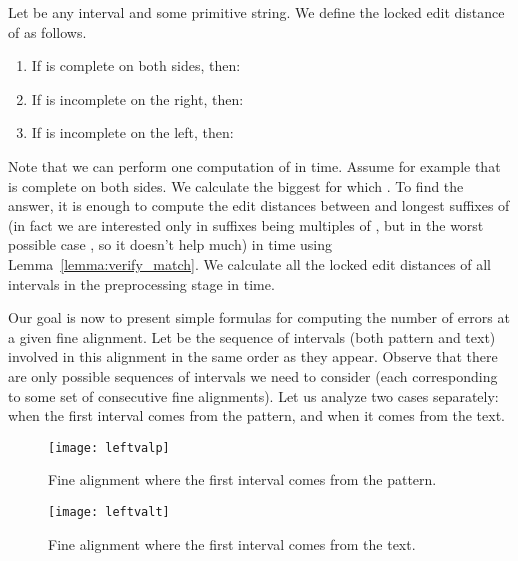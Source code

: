 \documentclass[runningheads]{llncs}
\begin{document}
\begin{definition}
Let  be any interval and  some primitive string. We define the locked edit distance of  as follows.
\begin{enumerate}
\item{If  is complete on both sides, then: }
\item{If  is incomplete on the right, then: }
\item{If  is incomplete on the left, then: }
\end{enumerate}
\end{definition}
Note that we can perform one computation of  in  time. Assume for example that  is complete on both sides. We calculate the biggest  for which . To find the answer, it is enough to compute the edit distances between  and  longest suffixes of  (in fact we are interested only in suffixes being multiples of , but in the worst possible case , so it doesn't help much) in  time using Lemma~\ref{lemma:verify_match}. We calculate all the locked edit distances of all  intervals in the preprocessing stage in  time.

Our goal is now to present simple formulas for computing the number of errors at a given fine alignment. Let  be the sequence of intervals (both pattern and text) involved in this alignment in the same order as they appear. Observe that there are only  possible sequences of intervals we need to consider (each corresponding to some set of consecutive fine alignments). Let us analyze two cases separately: when the first interval  comes from the pattern, and when it comes from the text.

\begin{figure}[t]
\texttt{[image: leftvalp]}
\caption{Fine alignment where the first interval comes from the pattern.}
\label{figure:leftvalp}
\end{figure}

\begin{figure}[t]
\texttt{[image: leftvalt]}
\caption{Fine alignment where the first interval comes from the text.}
\label{figure:leftvalt}

\end{figure}
\end{document}
